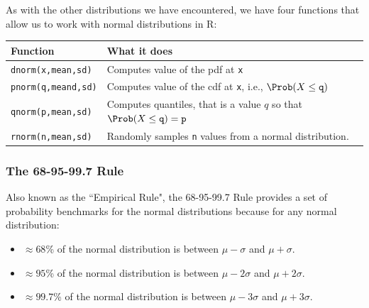 \documentclass[twoside]{book}\usepackage[]{graphicx}\usepackage[]{xcolor}
\def\R{{\sf R}}
\begin{document}
As with the other distributions we have encountered, we have four functions
that allow us to work with normal distributions in \R:

\begin{center}
\begin{tabular}{ll}
	\hline
	Function & What it does \\
	\hline
	\texttt{dnorm(x,mean,sd)} & Computes value of the pdf at \texttt{x}
	\\
	\texttt{pnorm(q,meand,sd)} 
		& Computes value of the cdf at \texttt{x}, i.e., 
	$\Prob(X \le \texttt{q})$
	\\
	\texttt{qnorm(p,mean,sd)} 
		& Computes quantiles, that is a value $q$ so that 
	$\Prob(X \le \texttt{q}) = \texttt{p}$
    \\
	\texttt{rnorm(n,mean,sd)} & Randomly samples \texttt{n} values from a
	normal distribution.
	\\
	\hline
\end{tabular}
\end{center}

\subsubsection{The 68-95-99.7 Rule}

Also known as the ``Empirical Rule", the 68-95-99.7 Rule provides a set of probability
benchmarks for the normal distributions because for any normal distribution: 
\begin{itemize} 
	\item
		$\approx 68$\% of the normal distribution is between 
		$\mu-\sigma$ and $\mu + \sigma$.
	\item
		$\approx 95$\% of the normal distribution is between 
		$\mu- 2\sigma$ and $\mu + 2\sigma$.
	\item
		$\approx 99.7$\% of the normal distribution is between 
		$\mu- 3\sigma$ and $\mu + 3\sigma$.
\end{itemize} 
\end{document}
